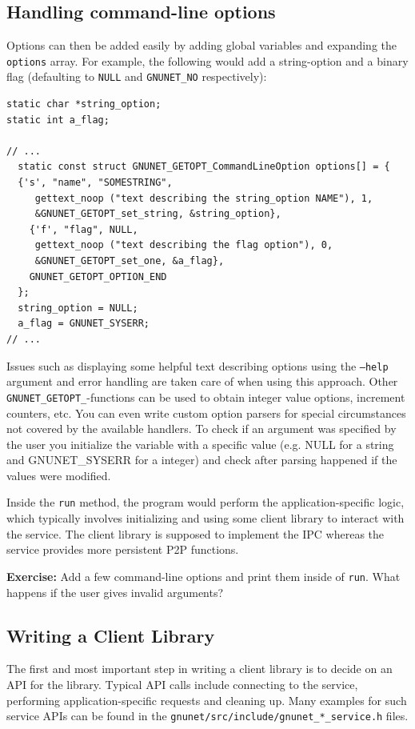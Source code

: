 \documentclass[10pt]{article}
\newcommand{\exercise}[1]{\noindent\begin{boxedminipage}{\textwidth}{\bf Exercise:} #1 \end{boxedminipage}}
\begin{document}
\subsection{Handling command-line options}

Options can then be added easily by adding global variables and
expanding the {\tt options} array.  For example, the following would
add a string-option and a binary flag (defaulting to {\tt NULL} and
{\tt GNUNET\_NO} respectively):

\begin{lstlisting}
static char *string_option;
static int a_flag;

// ...
  static const struct GNUNET_GETOPT_CommandLineOption options[] = {
  {'s', "name", "SOMESTRING",
     gettext_noop ("text describing the string_option NAME"), 1,
     &GNUNET_GETOPT_set_string, &string_option},
    {'f', "flag", NULL,
     gettext_noop ("text describing the flag option"), 0,
     &GNUNET_GETOPT_set_one, &a_flag},
    GNUNET_GETOPT_OPTION_END
  };
  string_option = NULL;
  a_flag = GNUNET_SYSERR;
// ...
\end{lstlisting}

Issues such as displaying some helpful text describing options using
the {\tt --help} argument and error handling are taken care of when
using this approach.  Other {\tt GNUNET\_GETOPT\_}-functions can be used
to obtain integer value options, increment counters, etc.  You can
even write custom option parsers for special circumstances not covered
by the available handlers. To check if an argument was specified by the
user you initialize the variable with a specific value (e.g. NULL for
a string and GNUNET\_SYSERR for a integer) and check after parsing
happened if the values were modified.

Inside the {\tt run} method, the program would perform the
application-specific logic, which typically involves initializing and
using some client library to interact with the service.  The client
library is supposed to implement the IPC whereas the service provides
more persistent P2P functions.

\exercise{Add a few command-line options and print them inside
of {\tt run}.  What happens if the user gives invalid arguments?}

\subsection{Writing a Client Library}

The first and most important step in writing a client library is to
decide on an API for the library.  Typical API calls include
connecting to the service, performing application-specific requests
and cleaning up.  Many examples for such service APIs can be found
in the {\tt gnunet/src/include/gnunet\_*\_service.h} files.
\end{document}
